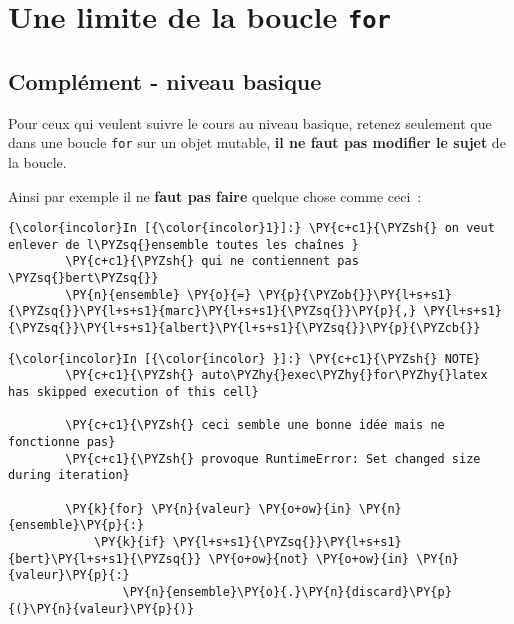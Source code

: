     
    
    
    

    

    \hypertarget{une-limite-de-la-boucle-for}{%
\section{\texorpdfstring{Une limite de la boucle
\texttt{for}}{Une limite de la boucle for}}\label{une-limite-de-la-boucle-for}}

    \hypertarget{compluxe9ment---niveau-basique}{%
\subsection{Complément - niveau
basique}\label{compluxe9ment---niveau-basique}}

    Pour ceux qui veulent suivre le cours au niveau basique, retenez
seulement que dans une boucle \texttt{for} sur un objet mutable,
\textbf{il ne faut pas modifier le sujet} de la boucle.

Ainsi par exemple il ne \textbf{faut pas faire} quelque chose comme
ceci~:

    \begin{Verbatim}[commandchars=\\\{\},frame=single,framerule=0.3mm,rulecolor=\color{cellframecolor}]
{\color{incolor}In [{\color{incolor}1}]:} \PY{c+c1}{\PYZsh{} on veut enlever de l\PYZsq{}ensemble toutes les chaînes }
        \PY{c+c1}{\PYZsh{} qui ne contiennent pas \PYZsq{}bert\PYZsq{}}
        \PY{n}{ensemble} \PY{o}{=} \PY{p}{\PYZob{}}\PY{l+s+s1}{\PYZsq{}}\PY{l+s+s1}{marc}\PY{l+s+s1}{\PYZsq{}}\PY{p}{,} \PY{l+s+s1}{\PYZsq{}}\PY{l+s+s1}{albert}\PY{l+s+s1}{\PYZsq{}}\PY{p}{\PYZcb{}}
\end{Verbatim}


    \begin{Verbatim}[commandchars=\\\{\},frame=single,framerule=0.3mm,rulecolor=\color{cellframecolor}]
{\color{incolor}In [{\color{incolor} }]:} \PY{c+c1}{\PYZsh{} NOTE}
        \PY{c+c1}{\PYZsh{} auto\PYZhy{}exec\PYZhy{}for\PYZhy{}latex has skipped execution of this cell}
        
        \PY{c+c1}{\PYZsh{} ceci semble une bonne idée mais ne fonctionne pas}
        \PY{c+c1}{\PYZsh{} provoque RuntimeError: Set changed size during iteration}
        
        \PY{k}{for} \PY{n}{valeur} \PY{o+ow}{in} \PY{n}{ensemble}\PY{p}{:}
            \PY{k}{if} \PY{l+s+s1}{\PYZsq{}}\PY{l+s+s1}{bert}\PY{l+s+s1}{\PYZsq{}} \PY{o+ow}{not} \PY{o+ow}{in} \PY{n}{valeur}\PY{p}{:}
                \PY{n}{ensemble}\PY{o}{.}\PY{n}{discard}\PY{p}{(}\PY{n}{valeur}\PY{p}{)}
\end{Verbatim}


